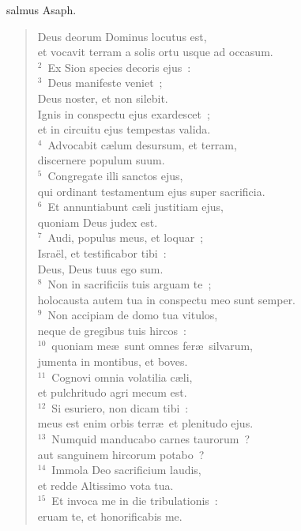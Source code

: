 \bchapter[Psalm]
salmus Asaph. \begin{verse}Deus deorum Dominus locutus est,\\ et vocavit terram a solis ortu usque ad occasum.\\
${}^{2}$~Ex Sion species decoris ejus~:\\
${}^{3}$~Deus manifeste veniet~;\\ Deus noster, et non silebit.\\ Ignis in conspectu ejus exardescet~;\\ et in circuitu ejus tempestas valida.\\
${}^{4}$~Advocabit c\ae lum desursum, et terram,\\ discernere populum suum.\\
${}^{5}$~Congregate illi sanctos ejus,\\ qui ordinant testamentum ejus super sacrificia.\\
${}^{6}$~Et annuntiabunt c\ae li justitiam ejus,\\ quoniam Deus judex est.\\
${}^{7}$~Audi, populus meus, et loquar~;\\ Isra\"el, et testificabor tibi~:\\ Deus, Deus tuus ego sum.\\
${}^{8}$~Non in sacrificiis tuis arguam te~;\\ holocausta autem tua in conspectu meo sunt semper.\\
${}^{9}$~Non accipiam de domo tua vitulos,\\ neque de gregibus tuis hircos~:\\
${}^{10}$~quoniam me\ae\ sunt omnes fer\ae\ silvarum,\\ jumenta in montibus, et boves.\\
${}^{11}$~Cognovi omnia volatilia c\ae li,\\ et pulchritudo agri mecum est.\\
${}^{12}$~Si esuriero, non dicam tibi~:\\ meus est enim orbis terr\ae\ et plenitudo ejus.\\
${}^{13}$~Numquid manducabo carnes taurorum~?\\ aut sanguinem hircorum potabo~?\\
${}^{14}$~Immola Deo sacrificium laudis,\\ et redde Altissimo vota tua.\\
${}^{15}$~Et invoca me in die tribulationis~:\\ eruam te, et honorificabis me.\\

\end{verse}
